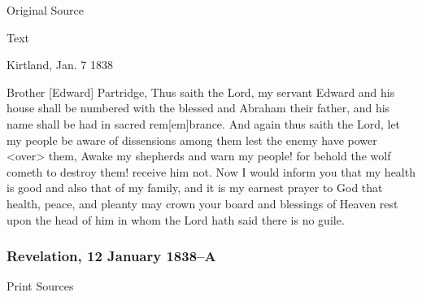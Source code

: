 				
				\begin{description}
					\item[Original Source]
				\end{description}
				
				
				\begin{description}
					\item[Text]
				\end{description}
					
					\begin{tightcenter}
					Kirtland, Jan. 7 1838
					\end{tightcenter}
					
					Brother [Edward] Partridge, Thus saith the Lord, my servant Edward and his house shall be numbered with the blessed and Abraham their father, and his name shall be had in sacred rem[em]brance. And again thus saith the Lord, let my people be aware of dissensions among them lest the enemy have power <over> them, Awake my shepherds and warn my people! for behold the wolf cometh to destroy them! receive him not. Now I would inform you that my health is good and also that of my family, and it is my earnest prayer to God that health, peace, and pleanty may crown your board and blessings of Heaven rest upon the head of him in whom the Lord hath said there is no guile.
					
		\subsubsection{Revelation, 12 January 1838--A}
			\label{EMS-1838-JS-12-JAN-1838-A}
			
			\begin{description}
					\item[Print Sources]
				\end{description}


